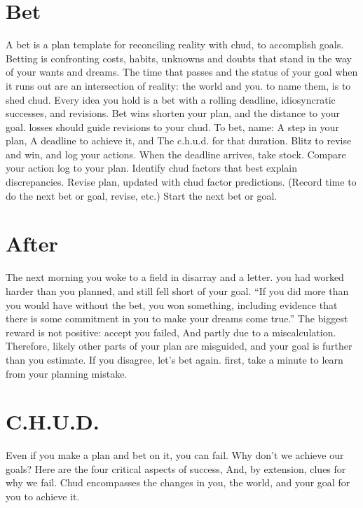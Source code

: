 \documentclass[
]{book}
\begin{document}
\hypertarget{bet-1}{%
\section{Bet}\label{bet-1}}

A bet is a plan template for reconciling reality with chud, to accomplish goals.
Betting is confronting costs, habits, unknowns and doubts that stand in the way of your wants and dreams.
The time that passes and the status of your goal when it runs out are an intersection of reality: the world and you. to name them, is to shed chud.
Every idea you hold is a bet with a rolling deadline, idiosyncratic successes, and revisions.
Bet wins shorten your plan, and the distance to your goal. losses should guide revisions to your chud.
To bet, name:
A step in your plan,
A deadline to achieve it, and
The c.h.u.d. for that duration.
Blitz to revise and win, and log your actions.
When the deadline arrives, take stock.
Compare your action log to your plan.
Identify chud factors that best explain discrepancies.
Revise plan, updated with chud factor predictions.
(Record time to do the next bet or goal, revise, etc.)
Start the next bet or goal.

\hypertarget{after}{%
\section{After}\label{after}}

The next morning you woke to a field in disarray and a letter. you had worked harder than you planned, and still fell short of your goal.
``If you did more than you would have without the bet, you won something, including evidence that there is some commitment in you to make your dreams come true.''
The biggest reward is not positive: accept you failed,
And partly due to a miscalculation.
Therefore, likely other parts of your plan are misguided, and your goal is further than you estimate.
If you disagree, let's bet again. first, take a minute to learn from your planning mistake.

\hypertarget{c.h.u.d.}{%
\section{C.H.U.D.}\label{c.h.u.d.}}

Even if you make a plan and bet on it, you can fail.
Why don't we achieve our goals?
Here are the four critical aspects of success,
And, by extension, clues for why we fail.
Chud encompasses the changes in you, the world, and your goal for you to achieve it.
\end{document}
